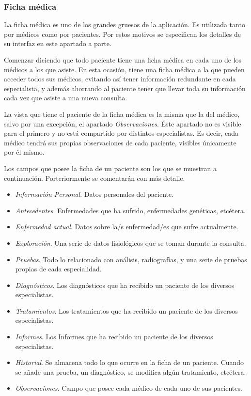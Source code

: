 		
	
	
	\subsubsection{Ficha médica} %
		\label{sub:interface_ficha_medica}
	
		La ficha médica es uno de los grandes gruesos de la aplicación. Es utilizada tanto por médicos como por pacientes. Por estos motivos se especifican los detalles de su interfaz en este apartado a parte.
		
		Comenzar diciendo que todo paciente tiene una ficha médica en cada uno de los médicos a los que asiste. En esta ocasión, tiene una ficha médica a la que pueden acceder todos sus médicos, evitando así tener información redundante en cada especialista, y además ahorrando al paciente tener que llevar toda su información cada vez que asiste a una nueva consulta.
		
		La vista que tiene el paciente de la ficha médica es la misma que la del médico, salvo por una excepción, el apartado \textit{Observaciones}. Éste apartado no es visible para el primero y no está compartido por distintos especialistas. Es decir, cada médico tendrá sus propias observaciones de cada paciente, visibles únicamente por él mismo. 
		
		Los campos que posee la ficha de un paciente son los que se muestran a continuación. Porteriormente se comentarán con más detalle.
		
		\begin{itemize}
			\item \textit{Información Personal}. Datos personales del paciente.
			\item \textit{Antecedentes}. Enfermedades que ha sufrido, enfermedades genéticas, etcétera.
			\item \textit{Enfermedad actual}. Datos sobre la/s enfermedad/es que sufre actualmente.
			\item \textit{Exploración}. Una serie de datos fisiológicos que se toman durante la consulta.
			\item \textit{Pruebas}. Todo lo relacionado con análisis, radiografías, y una serie de pruebas propias de cada especialidad.
			\item \textit{Diagnósticos}. Los diagnósticos que ha recibido un paciente de los diversos especialistas.
			\item \textit{Tratamientos}. Los tratamientos que ha recibido un paciente de los diversos especialistas.
			\item \textit{Informes}. Los Informes que ha recibido un paciente de los diversos especialistas.
			\item \textit{Historial}. Se almacena todo lo que ocurre en la ficha de un paciente. Cuando se añade una prueba, un diagnóstico, se modifica algún tratamiento, etcétera.
			\item \textit{Observaciones}. Campo que posee cada médico de cada uno de sus pacientes.
		\end{itemize}
		

